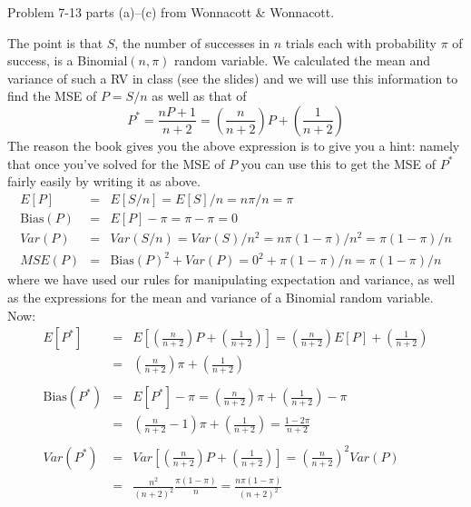 \documentclass[addpoints,12pt]{exam}\usepackage[]{graphicx}\usepackage[]{color}
\begin{document}
\begin{questions}

\question Problem 7-13 parts (a)--(c) from Wonnacott \& Wonnacott. 
    \begin{solution}
The point is that $S$, the number of successes in $n$ trials each with probability $\pi$ of success, is a Binomial$(n,\pi)$ random variable. We calculated the mean and variance of such a RV in class (see the slides) and we will use this information to find the MSE of $P = S/n$ as well as that of
  $$P^* = \frac{nP + 1}{n+2} = \left(\frac{n}{n+2}\right)P + \left(\frac{1}{n+2}\right)$$
The reason the book gives you the above expression is to give you a hint: namely that once you've solved for the MSE of $P$ you can use this to get the MSE of $P^*$ fairly easily by writing it as above.
  \begin{eqnarray*}
		E[P] &=& E[S/n] = E[S]/n = n\pi/n = \pi\\
		\mbox{Bias}(P) &=& E[P] - \pi = \pi - \pi = 0\\
		Var(P) &=& Var(S/n) = Var(S)/n^2 = n\pi(1-\pi)/n^2 = \pi(1-\pi)/n \\
		MSE(P) &=& \mbox{Bias}(P)^2 + Var(P) = 0^2 + \pi(1-\pi)/n = \pi(1-\pi)/n
	\end{eqnarray*}
where we have used our rules for manipulating expectation and variance, as well as the expressions for the mean and variance of a Binomial random variable. Now:
	\begin{eqnarray*}
		E[P^*] &=& E\left[ \left(\frac{n}{n+2}\right)P + \left(\frac{1}{n+2}\right)\right]=  \left(\frac{n}{n+2}\right)E[P] + \left(\frac{1}{n+2}\right)\\
			&=&  \left(\frac{n}{n+2}\right)\pi + \left(\frac{1}{n+2}\right)\\\\
		\mbox{Bias}(P^*) &=& E[P^*] - \pi =  \left(\frac{n}{n+2}\right)\pi + \left(\frac{1}{n+2}\right) - \pi\\
			&=&\left(\frac{n}{n+2} -1\right)\pi + \left(\frac{1}{n+2}\right) = \frac{1-2\pi}{n+2}\\\\
		Var(P^*) &=& Var\left[  \left(\frac{n}{n+2}\right)P + \left(\frac{1}{n+2}\right)\right] = \left(\frac{n}{n+2}\right)^2 Var(P)\\
		&=& \frac{n^2}{(n+2)^2} \frac{\pi(1-\pi)}{n} = \frac{n\pi(1-\pi)}{(n+2)^2}\\ \\

\end{eqnarray*}
\end{solution}
\end{questions}
\end{document}
